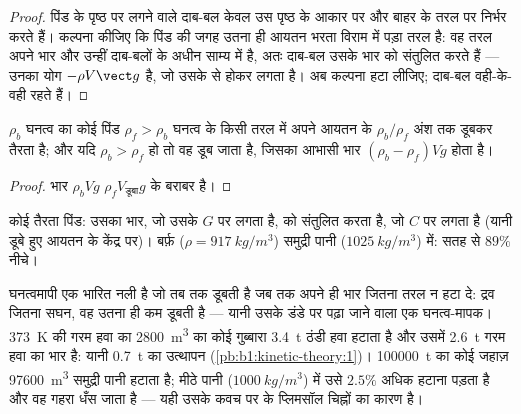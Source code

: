 \begin{proof}
पिंड के पृष्ठ पर लगने वाले दाब-बल केवल उस पृष्ठ के आकार पर और बाहर के तरल
पर निर्भर करते हैं। कल्पना कीजिए कि पिंड की जगह उतना ही आयतन भरता विराम
में पड़ा तरल है: वह तरल अपने भार और उन्हीं दाब-बलों के अधीन साम्य में है,
अतः दाब-बल उसके भार को संतुलित करते हैं --- उनका योग $-\rho V\vect g$ है,
जो उसके  से होकर लगता है। अब कल्पना हटा लीजिए; दाब-बल
वही-के-वही रहते हैं।
\end{proof}

\begin{corollary}[तैरना]\label{cor:b1:fluid-statics:floating}
$\rho_b$ घनत्व का कोई पिंड $\rho_f > \rho_b$ घनत्व के किसी तरल में अपने
आयतन के $\rho_b/\rho_f$ अंश तक डूबकर तैरता है; और यदि $\rho_b >
\rho_f$ हो तो वह डूब जाता है, जिसका आभासी भार $(\rho_b - \rho_f)Vg$ होता है।
\end{corollary}

\begin{proof}
भार $\rho_bVg$  $\rho_fV_{\text{डूबा}}g$ के बराबर है।
\end{proof}

\begin{omfigure}

{\small कोई तैरता पिंड: उसका भार, जो उसके  $G$ पर लगता है,
 को संतुलित करता है, जो  $C$ पर लगता है (यानी
डूबे हुए आयतन के केंद्र पर)। बर्फ़ ($\rho = \qty{917}{kg/m^3}$) समुद्री पानी
($\qty{1025}{kg/m^3}$) में: सतह से $89\%$ नीचे।}
\end{omfigure}

\begin{example}[तीन उत्प्लावन]\label{ex:b1:fluid-statics:buoy}
घनत्वमापी एक भारित नली है जो तब तक डूबती है जब तक अपने ही भार जितना तरल न
हटा दे: द्रव जितना सघन, वह उतना ही कम डूबती है --- यानी उसके डंडे पर पढ़ा
जाने वाला एक घनत्व-मापक। \qty{373}{K} की गरम हवा का \qty{2800}{m^3} का कोई
गुब्बारा \qty{3.4}{t} ठंडी हवा हटाता है और उसमें \qty{2.6}{t} गरम हवा का
भार है: यानी \qty{0.7}{t} का उत्थापन (\cref{pb:b1:kinetic-theory:1})।
\qty{100000}{t} का कोई जहाज़ \qty{97600}{m^3} समुद्री पानी हटाता है; मीठे
पानी ($\qty{1000}{kg/m^3}$) में उसे $2.5\%$ अधिक हटाना पड़ता है और वह गहरा
धँस जाता है --- यही उसके कवच पर के प्लिमसॉल चिह्नों का कारण है।
\end{example}

